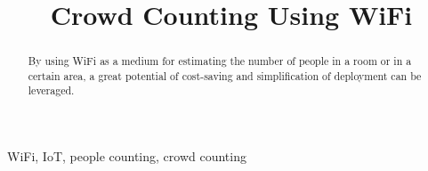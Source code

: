 \documentclass[conference]{IEEEtran}
\begin{document}
\title{Crowd Counting Using WiFi\\
}

\author{

}

\maketitle

\begin{abstract}
By using WiFi as a medium for estimating the number of people in a room or in a certain area, a great potential of cost-saving and simplification of deployment can be leveraged.
\vspace{80mm}
\end{abstract}

\begin{IEEEkeywords}
WiFi, IoT, people counting, crowd counting
\end{IEEEkeywords}

\end{document}
